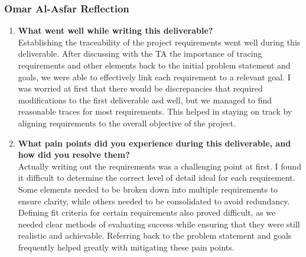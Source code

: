 \subsubsection*{Omar Al-Asfar Reflection}
\begin{enumerate}
  \item \textbf{What went well while writing this deliverable?} \\
  Establishing the traceability of the project requirements went well during this deliverable. After discussing with the TA the importance of tracing requirements and other elements back to the initial problem statement and goals, we were able to effectively link each requirement to a relevant goal. I was worried at first that there would be discrepancies that required modifications to the first deliverable asd well, but we managed to find reasonable traces for most requirements. This helped in staying on track by aligning requirements to the overall objective of the project.
  \item \textbf{What pain points did you experience during this deliverable, and how did you resolve them?} \\
  Actually writing out the requirements was a challenging point at first. I found it difficult to determine the correct level of detail ideal for each requirement. Some elements needed to be broken down into multiple requirements to ensure clarity, while others needed to be consolidated to avoid redundancy. Defining fit criteria for certain requirements also proved difficult, as we needed clear methods of evaluating success while ensuring that they were still realistic and achievable. Referring back to the problem statement and goals frequently helped greatly with mitigating these pain points.
\end{enumerate}

